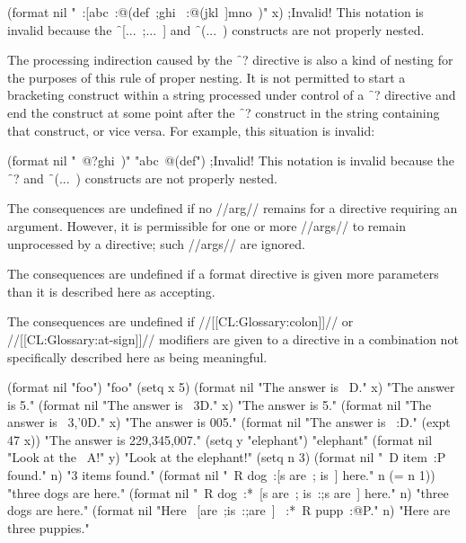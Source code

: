 \code
 (format nil "~:[abc~:@(def~;ghi~
:@(jkl~]mno~)" x) ;Invalid!
\endcode
This notation is invalid because the \f{~[...~;...~]}
and \f{~(...~)} constructs are not properly nested.
                                   

The processing indirection caused by the \f{~?} directive
is also a kind of nesting for the purposes of this rule of proper nesting.
It is not permitted to
start a bracketing construct within a string processed
under control of a \f{~?}                                      
directive and end the construct at some point after the \f{~?} construct
in the string containing that construct, or vice versa.
For example, this situation is invalid:
                                                                               
\code
 (format nil "~@?ghi~)" "abc~@(def") ;Invalid!
\endcode
This notation
is invalid because the \f{~?}
and \f{~(...~)} constructs are not properly nested.

\endsubsubsection%



The consequences are undefined if no //arg// remains for a directive 
requiring an argument.  However, it is permissible for one or more //args// 
to remain unprocessed by a directive; such //args// are ignored.
 
\endsubsubsection%



The consequences are undefined if a format directive is given more parameters 
than it is described here as accepting.

\endsubsubsection%



The consequences are undefined if //[[CL:Glossary:colon]]// or //[[CL:Glossary:at-sign]]// modifiers
are given to a directive in a combination not specifically described
here as being meaningful.

\endsubsubsection%

\endsubsection%





\code
 (format nil "foo") \EV "foo"
 (setq x 5) 
 (format nil "The answer is ~D." x) \EV "The answer is 5."
 (format nil "The answer is ~3D." x) \EV "The answer is   5."
 (format nil "The answer is ~3,'0D." x) \EV "The answer is 005."
 (format nil "The answer is ~:D." (expt 47 x))
\EV "The answer is 229,345,007."
 (setq y "elephant") \EV "elephant"
 (format nil "Look at the ~A!" y) \EV "Look at the elephant!"
 (setq n 3) 
 (format nil "~D item~:P found." n) \EV "3 items found."
 (format nil "~R dog~:[s are~; is~] here." n (= n 1))
\EV "three dogs are here."
 (format nil "~R dog~:*~[s are~; is~:;s are~] here." n)
\EV "three dogs are here."
 (format nil "Here ~[are~;is~:;are~] ~:*~R pupp~:@P." n)
\EV "Here are three puppies."
\endcode

